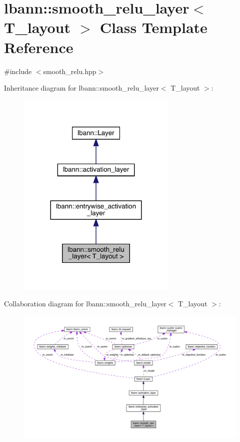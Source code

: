 \hypertarget{classlbann_1_1smooth__relu__layer}{}\section{lbann\+:\+:smooth\+\_\+relu\+\_\+layer$<$ T\+\_\+layout $>$ Class Template Reference}
\label{classlbann_1_1smooth__relu__layer}


{\ttfamily \#include $<$smooth\+\_\+relu.\+hpp$>$}



Inheritance diagram for lbann\+:\+:smooth\+\_\+relu\+\_\+layer$<$ T\+\_\+layout $>$\+:\nopagebreak
\begin{figure}[H]
\begin{center}
\leavevmode
\includegraphics[width=216pt]{classlbann_1_1smooth__relu__layer__inherit__graph}
\end{center}
\end{figure}


Collaboration diagram for lbann\+:\+:smooth\+\_\+relu\+\_\+layer$<$ T\+\_\+layout $>$\+:\nopagebreak
\begin{figure}[H]
\begin{center}
\leavevmode
\includegraphics[width=350pt]{classlbann_1_1smooth__relu__layer__coll__graph}
\end{center}
\end{figure}
